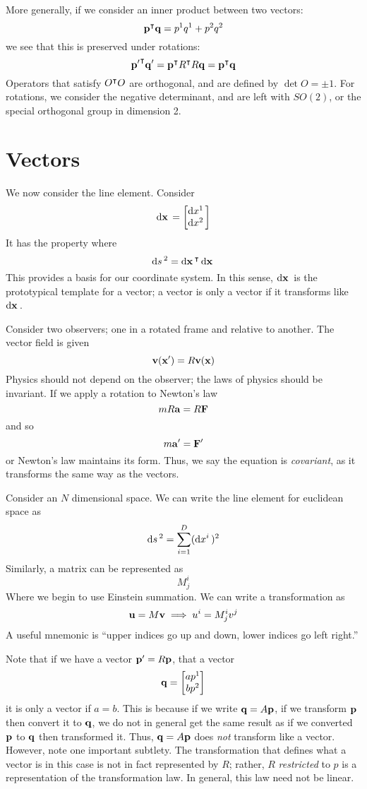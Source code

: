 More generally, if we consider an inner product between two vectors:
\[\mathbf{p}^\intercal \mathbf{q}= p^1q^1+p^2q^2\]
we see that this is preserved under rotations:
\[{\mathbf{p}'} ^\intercal \mathbf{q}' = \mathbf{p}^\intercal R^\intercal R \mathbf{q} = \mathbf{p}^\intercal\mathbf{q}\]
Operators that satisfy \(O^\intercal O\) are orthogonal, and are defined by \(\det O = \pm 1\).  For rotations, we consider the negative determinant, and are left with \(SO(2)\), or the special orthogonal group in dimension 2.

\section{Vectors}
We now consider the line element. Consider 
\begin{equation}
	\d{\vb x} = \begin{bmatrix}
		\d{x^1}\\\d{x^2}
	\end{bmatrix}
\end{equation}
It has the property where 
\[\d{s}^2 = \d{\vb x}\T\d{\vb{x}}\]
This provides a basis for our coordinate system. In this sense, \(\d{\vb x}\) is the prototypical template for a vector; a vector is only a vector if it transforms like \(\d{\vb x}\).

Consider two observers; one in a rotated frame and relative to another. The vector field is given
\[\mathbf{v}(\mathbf{x}') = R\mathbf{v}(\mathbf{x})\]
Physics should not depend on the observer; the laws of physics should be invariant. If we apply a rotation to Newton's law
\[mR\mathbf{a} = R\mathbf{F}\]
and so
\[m\mathbf{a}' = \mathbf{F}'\]
or Newton's law maintains its form. Thus, we say the equation is \emph{covariant}, as it transforms the same way as the vectors.

\begin{aside}[\(N\)-Dimensions]
Consider an \(N\) dimensional space. We can write the line element for euclidean space as
\[\d{s}^2 = \sum_{i=1}^D (\d{x^i})^2\]
Similarly, a matrix can be represented as
\[M^{i}_j\]
Where we begin to use Einstein summation. We can write a transformation as
\[\mathbf{u} =M\mathbf{v}\implies u^i = M^i_jv^j\]
A useful mnemonic is ``upper indices go up and down, lower indices go left right.''
\end{aside}

Note that if we have a vector \(\mathbf{p}' = R\mathbf{p}\), that a vector 
\[\mathbf{q} = \begin{bmatrix}
	a p^1\\
	bp^2
\end{bmatrix}\]
it is only a vector if \(a=b\). This is because if we write \(\mathbf{q} = A\mathbf{p}\), if we transform \(\mathbf{p}\) then convert it to \(\mathbf{q}\), we do not in general get the same result as if we converted \(\mathbf{p}\) to \(\mathbf{q}\) then transformed it. Thus, \(\mathbf{q}=A\mathbf{p}\) does \emph{not} transform like a vector. However, note one important subtlety. The transformation that defines what a vector is in this case is not in fact represented by \(R\); rather, \(R\) \emph{restricted} to \(p\) is a representation of the transformation law. In general, this law need not be linear.


